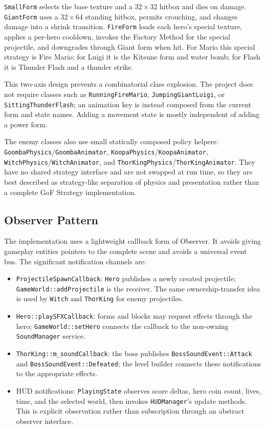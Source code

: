 \texttt{SmallForm} selects the base texture and a $32\times32$ hitbox and dies
on damage.  \texttt{GiantForm} uses a $32\times64$ standing hitbox, permits
crouching, and changes damage into a shrink transition.  \texttt{FireForm}
loads each hero's special texture, applies a per-hero cooldown, invokes the
Factory Method for the special projectile, and downgrades through Giant form
when hit.  For Mario this special strategy is Fire Mario; for Luigi it is the
Kitsune form and water bomb; for Flash it is Thunder Flash and a thunder strike.

This two-axis design prevents a combinatorial class explosion.  The project
does not require classes such as \texttt{RunningFireMario},
\texttt{JumpingGiantLuigi}, or \texttt{SittingThunderFlash}; an animation key is
instead composed from the current form and state names.  Adding a movement
state is mostly independent of adding a power form.

The enemy classes also use small statically composed policy helpers:
\texttt{GoombaPhysics}/\texttt{GoombaAnimator},
\texttt{KoopaPhysics}/\texttt{KoopaAnimator},
\texttt{WitchPhysics}/\texttt{WitchAnimator}, and
\texttt{ThorKingPhysics}/\texttt{ThorKingAnimator}.  They have no shared
strategy interface and are not swapped at run time, so they are best described
as strategy-like separation of physics and presentation rather than a complete
GoF Strategy implementation.

\subsection{Observer Pattern}
\label{subsec:observer-pattern}

The implementation uses a lightweight callback form of Observer.  It avoids
giving gameplay entities pointers to the complete scene and avoids a universal
event bus.  The significant notification channels are:

\begin{itemize}
    \item \texttt{ProjectileSpawnCallback}: \texttt{Hero} publishes a newly
    created projectile; \texttt{GameWorld::addProjectile} is the receiver.
    The same ownership-transfer idea is used by \texttt{Witch} and
    \texttt{ThorKing} for enemy projectiles.
    \item \texttt{Hero::playSFXCallback}: forms and blocks may request effects
    through the hero; \texttt{GameWorld::setHero} connects the callback to the
    non-owning \texttt{SoundManager} service.
    \item \texttt{ThorKing::m\_soundCallback}: the boss publishes
    \texttt{BossSoundEvent::Attack} and \texttt{BossSoundEvent::Defeated}; the
    level builder connects these notifications to the appropriate effects.
    \item HUD notifications: \texttt{PlayingState} observes score deltas, hero
    coin count, lives, time, and the selected world, then invokes
    \texttt{HUDManager}'s update methods.  This is explicit observation rather
    than subscription through an abstract observer interface.
\end{itemize}

